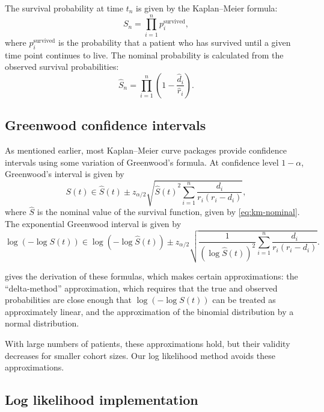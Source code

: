 \documentclass[article]{jss}
\newcommand{\KM}{Kaplan--Meier} %
\begin{document}
The survival probability at time \(t_n\) is given by the \KM{} formula:
\begin{equation}
S_n = \prod_{i=1}^{n} p_i^\text{survived}, \label{eq:km-survival}
\end{equation}
where \(p_i^\text{survived}\) is the probability that a patient who has survived until a given time point continues to live. The nominal probability is calculated from the observed survival probabilities:
\begin{equation}
\hat{S}_n = \prod_{i=1}^{n} \left(1 - \frac{\hat{d}_i}{\hat{r}_i}\right). \label{eq:km-nominal}
\end{equation}

\subsection{Greenwood confidence intervals}\label{sec:greenwood}

As mentioned earlier, most \KM{} curve packages provide confidence intervals using some variation of Greenwood's formula. At confidence level \(1-\alpha\), Greenwood's interval is given by
\begin{equation}
\label{eq:greenwood}
S(t)\in\hat{S}(t) \pm z_{\alpha/2} \sqrt{{\hat{S}(t)}^2{\sum_{i=1}^{n} \frac{d_i}{r_i(r_i-d_i)}}},
\end{equation}
where \(\hat{S}\) is the nominal value of the survival function, given by \cref{eq:km-nominal}. The exponential Greenwood interval is given by
\begin{equation}
\label{eq:exponential-greenwood}
\log{\left(-\log S(t)\right)} \in \log{\left(-\log \hat{S}(t)\right)} \pm z_{\alpha/2} \sqrt{\frac{1}{{\left(\log \hat{S}(t)\right)}^2} \sum_{i=1}^{n} \frac{d_i}{r_i(r_i-d_i)}}.
\end{equation}

\citet{GreenwoodNotes} gives the derivation of these formulas, which makes certain approximations: the ``delta-method'' approximation, which requires that the true and observed probabilities are close enough that \(\log\left(-\log S(t)\right)\) can be treated as approximately linear, and the approximation of the binomial distribution by a normal distribution.

With large numbers of patients, these approximations hold, but their validity decreases for smaller cohort sizes. Our log likelihood method avoids these approximations.

\subsection{Log likelihood implementation}
\end{document}
